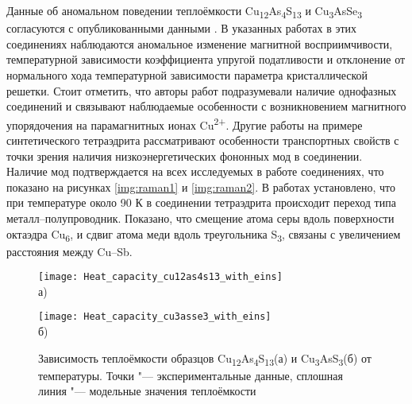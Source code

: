 Данные об аномальном поведении теплоёмкости Cu\textsubscript{12}As\textsubscript{4}S\textsubscript{13} и Cu\textsubscript{3}AsSe\textsubscript{3} согласуются с опубликованными данными \cite{bab_1982,bab_81}.
В указанных работах в этих соединениях наблюдаются аномальное изменение магнитной восприимчивости, температурной зависимости коэффициента упругой податливости и отклонение от нормального хода температурной зависимости параметра кристаллической решетки.
Стоит отметить, что авторы работ \cite{bab_1982,bab_81} подразумевали наличие однофазных соединений и связывают наблюдаемые особенности с возникновением магнитного упорядочения на парамагнитных ионах Cu\textsuperscript{2+}.
Другие работы \cite{Lara-Curzio2014,Nasonova2016} на примере синтетического тетраэдрита рассматривают особенности транспортных свойств  с точки зрения наличия низкоэнергетических фононных мод в соединении. Наличие мод подтверждается на всех исследуемых в работе соединениях, что показано на рисунках \ref{img:raman1} и \ref{img:raman2}.
В работах \cite{Lara-Curzio2014,Nasonova2016} установлено, что при температуре около 90 К в соединении тетраэдрита происходит переход типа металл--полупроводник. Показано, что смещение атома серы вдоль поверхности октаэдра Cu\textsubscript{6}, и сдвиг атома меди вдоль треугольника S\textsubscript{3}, связаны с увеличением расстояния между Cu--Sb.

\begin{figure}[p!]
  \begin{minipage}[ht]{0.9\linewidth}\centering
    \texttt{[image: Heat\_capacity\_cu12as4s13\_with\_eins]} \\ а)
  \end{minipage}
  \vfill
  \begin{minipage}[ht]{0.9\linewidth}\centering
    \texttt{[image: Heat\_capacity\_cu3asse3\_with\_eins]} \\ б)
  \end{minipage}

      \caption[Зависимость теплоёмкости образцов Cu\textsubscript{12}As\textsubscript{4}S\textsubscript{13}(а) и Cu\textsubscript{3}AsS\textsubscript{3}(б) от температуры. Точки "--- экспериментальные данные, сплошная линия "--- модельные значения теплоёмкости]{Зависимость теплоёмкости образцов Cu\textsubscript{12}As\textsubscript{4}S\textsubscript{13}(а) и Cu\textsubscript{3}AsS\textsubscript{3}(б) от температуры. Точки "--- экспериментальные данные, сплошная линия "--- модельные значения теплоёмкости}
    \label{img:heat_en}
\end{figure}


